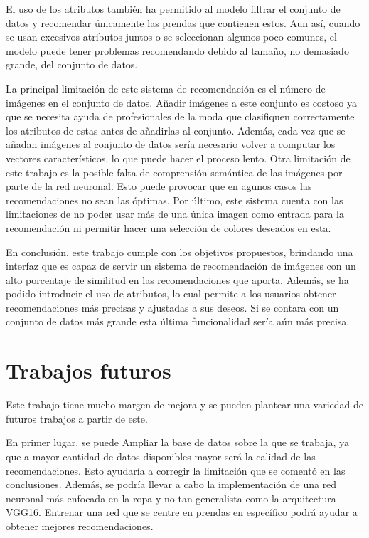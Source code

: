 \documentclass[12pt]{report} %
\begin{document}
	El uso de los atributos también ha permitido al modelo filtrar el conjunto de datos y recomendar únicamente las prendas
	que contienen estos. Aun así, cuando se usan excesivos atributos juntos o se seleccionan algunos poco comunes, el modelo puede tener problemas
	recomendando debido al tamaño, no demasiado grande, del conjunto de datos.

	La principal limitación de este sistema de recomendación es el número de imágenes en el conjunto de datos. Añadir imágenes a este conjunto es costoso
	ya que se necesita ayuda de profesionales de la moda que clasifiquen correctamente los atributos de estas antes de añadirlas al conjunto. Además, cada vez
	que se añadan imágenes al conjunto de datos sería necesario volver a computar los vectores característicos, lo que puede hacer el proceso lento.
	Otra limitación de este trabajo es la posible falta de comprensión semántica de las imágenes por parte de la red neuronal. Esto puede provocar que en
	agunos casos las recomendaciones no sean las óptimas. Por último, este sistema cuenta con las limitaciones de no poder usar más de una única imagen como
	entrada para la recomendación ni permitir hacer una selección de colores deseados en esta.

	En conclusión, este trabajo cumple con los objetivos propuestos, brindando una interfaz que es capaz
	de servir un sistema de recomendación de imágenes con un alto porcentaje de similitud en las recomendaciones que aporta. Además, se ha podido introducir el uso de
	atributos, lo cual permite a los usuarios obtener recomendaciones más precisas y ajustadas a sus deseos. Si se contara con un conjunto de
	datos más grande esta última funcionalidad sería aún más precisa.

	\chapter{Trabajos futuros}
	
	Este trabajo tiene mucho margen de mejora y se pueden plantear
	una variedad de futuros trabajos a partir de este.

	En primer lugar, se puede Ampliar la base de datos sobre la que se trabaja, ya que a mayor cantidad de datos disponibles mayor será la calidad de 
	las recomendaciones. Esto ayudaría a corregir la limitación que se comentó en las conclusiones. Además, se podría llevar a cabo la
	implementación de una red neuronal más enfocada en la ropa y no tan generalista como la arquitectura VGG16. Entrenar una red que se centre en
	prendas en específico podrá ayudar a obtener mejores recomendaciones. 
\end{document}

